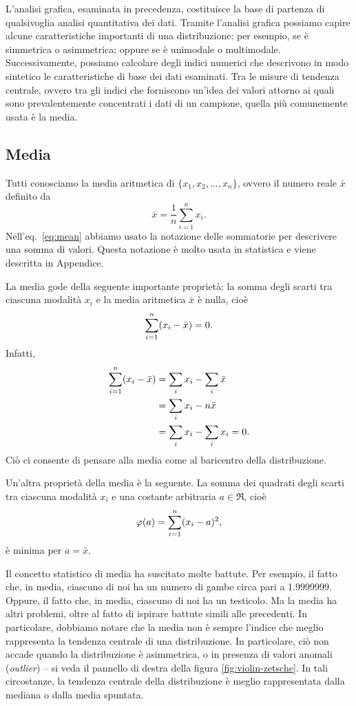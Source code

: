 \documentclass[
  10pt,
  italian,
  a4paper,
  extrafontsizes,onecolumn,openright
  ]{memoir}
\theoremstyle{definition}
\theoremstyle{definition}
\theoremstyle{definition}
\theoremstyle{definition}
\theoremstyle{remark}
\begin{document}
L'analisi grafica, esaminata in precedenza, costituisce la base di
partenza di qualsivoglia analisi quantitativa dei dati. Tramite
l'analisi grafica possiamo capire alcune caratteristiche importanti di
una distribuzione: per esempio, se è simmetrica o asimmetrica; oppure se
è unimodale o multimodale. Successivamente, possiamo calcolare degli
indici numerici che descrivono in modo sintetico le caratteristiche di
base dei dati esaminati. Tra le misure di tendenza centrale, ovvero tra
gli indici che forniscono un'idea dei valori attorno ai quali sono
prevalentemente concentrati i dati di un campione, quella più
comunemente usata è la media.

\hypertarget{media}{%
\subsection{Media}\label{media}}

Tutti conosciamo la media aritmetica di \(\{x_1, x_2, \dots, x_n\}\),
ovvero il numero reale \(\bar{x}\) definito da
\begin{equation}
\bar{x}=\frac{1}{n}\sum_{i=1}^n x_i.
\label{eq:mean}
\end{equation}
Nell'eq.~\eqref{eq:mean} abbiamo usato la notazione delle sommatorie
per descrivere una somma di valori. Questa notazione è molto usata in
statistica e viene descritta in Appendice.

La media gode della seguente importante proprietà: la somma degli scarti
tra ciascuna modalità \(x_i\) e la media aritmetica \(\bar{x}\) è nulla,
cioè
\[
\sum_{i=1}^n (x_i - \bar{x}) = 0.\notag
\label{eq:diffmeansumzero}\] Infatti, \[\begin{aligned}
\sum_{i=1}^n (x_i - \bar{x}) &= \sum_i x_i - \sum_i \bar{x}\notag\\
&= \sum_i x_i - n \bar{x}\notag\\
&= \sum_i x_i - \sum_i x_i = 0.\notag\end{aligned}
\]
Ciò ci consente di pensare alla media come al baricentro della distribuzione.

Un'altra proprietà della media è la seguente. La somma dei quadrati
degli scarti tra ciascuna modalità \(x_i\) e una costante arbitraria
\(a \in \Re\), cioè \[\varphi(a) = \sum_{i=1}^n (x_i - a)^2,\notag\] è
minima per \(a = \bar{x}\).

Il concetto statistico di media ha suscitato molte battute. Per esempio,
il fatto che, in media, ciascuno di noi ha un numero di gambe circa pari
a 1.9999999. Oppure, il fatto che, in media, ciascuno di noi ha un
testicolo. Ma la media ha altri problemi, oltre al fatto di ispirare
battute simili alle precedenti. In particolare, dobbiamo notare che la
media non è sempre l'indice che meglio rappresenta la tendenza centrale
di una distribuzione. In particolare, ciò non accade quando la
distribuzione è asimmetrica, o in presenza di valori anomali (\emph{outlier})
-- si veda il pannello di destra della figura \ref{fig:violin-zetsche}. In tali circostanze, la tendenza centrale della distribuzione è meglio rappresentata dalla mediana o dalla media spuntata.
\end{document}
